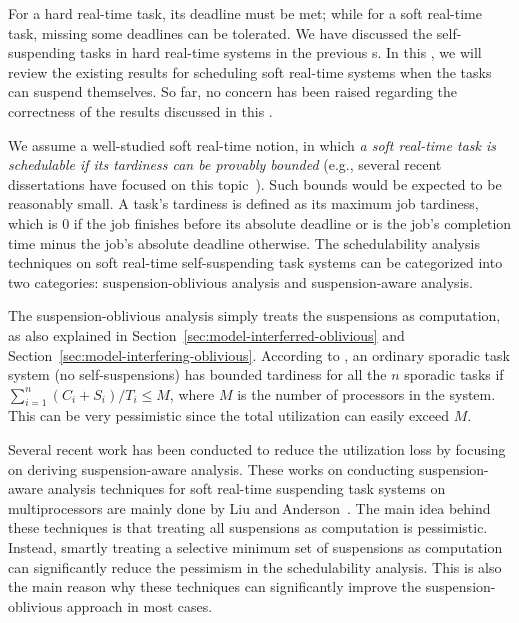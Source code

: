 \label{sec:soft-realtime}

For a hard real-time task, its deadline must be met; while for a soft real-time task, missing some deadlines can be tolerated. We have discussed the self-suspending tasks in hard real-time systems in the previous \mysectionrefnormal{}s. In this \mysectionrefnormal{}, we will review the existing results for scheduling soft real-time systems when the tasks can suspend themselves. So far, no concern has been raised regarding the correctness of the results discussed in this \mysectionrefnormal{}. 


 We assume a well-studied soft real-time notion, in which \emph{a soft real-time task is schedulable if its tardiness can be provably bounded} (e.g., several recent dissertations have focused on this topic~\cite{leontyev2010compositional, devi2006soft}). Such bounds would be expected to be reasonably small. A task's tardiness is defined as its maximum job tardiness, which is $0$ if the job finishes before its absolute deadline or is the job's completion time minus the job's absolute deadline otherwise. 
The schedulability analysis techniques on soft real-time self-suspending task systems can be categorized into two categories: suspension-oblivious analysis and suspension-aware analysis.

\label{sec:sus-oblivious-soft}

 The suspension-oblivious analysis simply treats the suspensions as computation, as also explained in Section~\ref{sec:model-interferred-oblivious} and Section~\ref{sec:model-interfering-oblivious}. According to \cite{Devi2005,Leontyev072},
an ordinary sporadic task system (\ie no self-suspensions) has bounded tardiness for all the $n$ sporadic tasks if $\sum_{i=1}^{n} (C_i+S_i)/T_i \leq M$, where $M$ is the number of processors in the system. This can be very pessimistic since the total utilization can easily exceed $M$.

\label{sec:sus-aware-soft}

Several recent work has been conducted to reduce the utilization loss by focusing on deriving suspension-aware analysis. 
These works on conducting suspension-aware analysis techniques for soft real-time suspending task systems on multiprocessors are mainly done by Liu and Anderson~\cite{Liu3,Liu4,Liu5,Liu9,Liu11}. The main idea behind these techniques is that treating all suspensions as computation is pessimistic. Instead, smartly treating a selective minimum set of suspensions as computation can significantly reduce the pessimism in the schedulability analysis. This is also the main reason why these techniques can significantly improve the suspension-oblivious approach in most cases.

